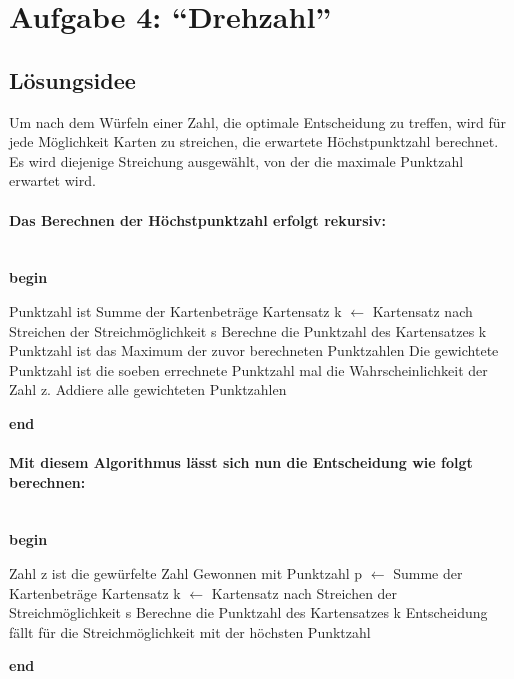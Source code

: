 \section{Aufgabe 4: ``Drehzahl''}
\subsection{L\"osungsidee}
Um nach dem Würfeln einer Zahl, die optimale Entscheidung zu treffen, wird für jede Möglichkeit Karten zu streichen, die erwartete Höchstpunktzahl berechnet. Es wird diejenige Streichung ausgewählt, von der die maximale Punktzahl erwartet wird.
\paragraph{Das Berechnen der Höchstpunktzahl erfolgt rekursiv:}
\textbf{\\begin}
\begin{algorithmic}
   \STATE Punktzahl ist Summe der Kartenbeträge 
 \ELSE
   \STATE Kartensatz k $\gets$ Kartensatz nach Streichen der Streichmöglichkeit s
   \STATE Berechne die Punktzahl des Kartensatzes k 
  \ENDFOR
  \STATE Punktzahl ist das Maximum der zuvor berechneten Punktzahlen
 \ENDIF
 \STATE Die gewichtete Punktzahl ist die soeben errechnete Punktzahl mal die Wahrscheinlichkeit der Zahl z.
\ENDFOR
\STATE Addiere alle gewichteten Punktzahlen
\end{algorithmic}
\textbf{end}

\paragraph*{Mit diesem Algorithmus lässt sich nun die Entscheidung wie folgt berechnen:}
\textbf{\\begin}
\begin{algorithmic}
\STATE Zahl z ist die gewürfelte Zahl
  \STATE Gewonnen mit Punktzahl p $\gets$ Summe der Kartenbeträge
\ELSE
  \STATE Kartensatz k $\gets$ Kartensatz nach Streichen der Streichmöglichkeit s
  \STATE Berechne die Punktzahl des Kartensatzes k 
 \ENDFOR
 \STATE Entscheidung fällt für die Streichmöglichkeit mit der höchsten Punktzahl
\ENDIF
\end{algorithmic}
\textbf{end}


